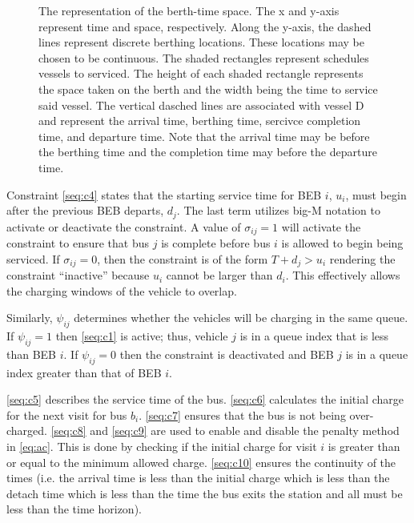 \documentclass[11pt,a4paper,final]{article}
\begin{document}
\begin{figure}[ht!]
{{
  }}
  \caption{The representation of the berth-time space. The x and y-axis represent time and space, respectively. Along the y-axis, the dashed lines represent discrete berthing locations. These locations may be chosen to be continuous. The shaded rectangles represent schedules vessels to serviced. The height of each shaded rectangle represents the space taken on the berth and the width being the time to service said vessel. The vertical dasched lines are associated with vessel D and represent the arrival time, berthing time, sercivce completion time, and departure time. Note that the arrival time may be before the berthing time and the completion time may before the departure time.}
  \label{fig:spacial-and-temporal-constr}
\end{figure}

Constraint \ref{seq:c4} states that the starting service time for BEB \(i\), \(u_i\), must begin after the previous BEB
departs, \(d_j\). The last term utilizes big-M notation to activate or deactivate the constraint. A value of \(\sigma_{ij} = 1\)
will activate the constraint to ensure that bus \(j\) is complete before bus \(i\) is allowed to begin being serviced. If
\(\sigma_{ij} = 0\), then the constraint is of the form \(T + d_j > u_i\) rendering the constraint ``inactive'' because \(u_i\)
cannot be larger than \(d_i\). This effectively allows the charging windows of the vehicle to overlap.

Similarly, \(\psi_{ij}\) determines whether the vehicles will be charging in the same queue. If \(\psi_{ij} = 1\) then
\eqref{seq:c1} is active; thus, vehicle \(j\) is in a queue index that is less than BEB \(i\). If \(\psi_{ij} = 0\) then the
constraint is deactivated and BEB \(j\) is in a queue index greater than that of BEB \(i\).

\ref{seq:c5} describes the service time of the bus. \ref{seq:c6} calculates the initial charge for the next visit for
bus \(b_i\). \ref{seq:c7} ensures that the bus is not being over-charged. \ref{seq:c8} and \ref{seq:c9} are used to
enable and disable the penalty method in \ref{eq:ac}. This is done by checking if the initial charge for visit \(i\) is greater
than or equal to the minimum allowed charge. \ref{seq:c10} ensures the continuity of the times (i.e. the arrival time is
less than the initial charge which is less than the detach time which is less than the time the bus exits the station
and all must be less than the time horizon).
\end{document}
